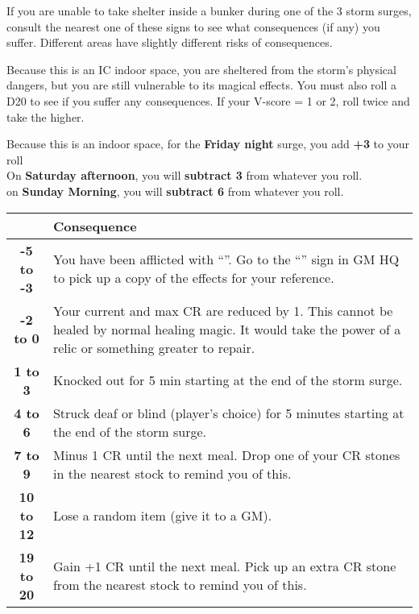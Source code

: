 \documentclass[green]{GL2020}
\begin{document}
\name{\gStormSurgeInside{}}

If you are unable to take shelter inside a bunker during one of the 3 storm surges, consult the nearest one of these signs to see what consequences (if any) you suffer. Different areas have slightly different risks of consequences.

Because this is an IC indoor space, you are sheltered from the storm’s physical dangers, but you are still vulnerable to its magical effects. You must also roll a D20 to see if you suffer any consequences. If your V-score = 1 or 2, roll twice and take the higher.

{\large Because this is an indoor space, for the \textbf{Friday night} surge, you add \textbf{+3} to your roll}\\
{\large On \textbf{Saturday afternoon}, you will \textbf{subtract 3} from whatever you roll.}\\
{\large on \textbf{Sunday Morning}, you will \textbf{subtract 6} from whatever you roll.}\\

\begin{tabularx}{\textwidth}{|>{\centering\arraybackslash}c | >{\centering\arraybackslash}X |}
\hline
  {\large Your Total} & {\large Consequence}  \\
\hline

 \textbf{-5 to -3} & You have been afflicted with ``\gBadLuckCurse{}''. Go to the ``\sStormSurgeConsequences{}'' sign in GM HQ to pick up a copy of the effects for your reference. \\
\hline
 \textbf{-2 to 0} & Your current and max CR are reduced by 1. This cannot be healed by normal healing magic. It would take the power of a relic or something greater to repair.  \\
\hline
 \textbf{1 to 3} & Knocked out for 5 min starting at the end of the storm surge.  \\
\hline
  \textbf{4 to 6} & Struck deaf or blind (player’s choice) for 5 minutes starting at the end of the storm surge.  \\
\hline
  \textbf{7 to 9} & Minus 1 CR until the next meal. Drop one of your CR stones in the nearest stock to remind you of this.  \\
\hline
  \textbf{10 to 12} & Lose a random item (give it to a GM).  \\
\hline
 \textbf{19 to 20} & Gain +1 CR until the next meal. Pick up an extra CR stone from the nearest stock to remind you of this.  \\
\hline
\end{tabularx}
\end{document}
